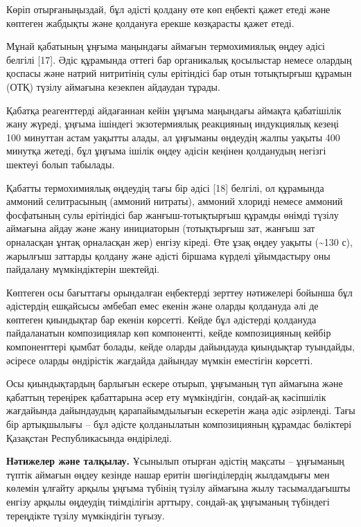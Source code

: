 \begin{multicols}{2}
Көріп отырғаныңыздай, бұл әдісті қолдану өте көп еңбекті қажет етеді
және көптеген жабдықты және қолдануға ерекше көзқарасты қажет етеді.

Мұнай қабатының ұңғыма маңындағы аймағын термохимиялық өңдеу әдісі
белгілі {[}17{]}. Әдіс құрамында оттегі бар органикалық қосылыстар
немесе олардың қоспасы және натрий нитритінің сулы ерітіндісі бар отын
тотықтырғыш құрамын (ОТҚ) түзілу аймағына кезекпен айдаудан тұрады.

Қабатқа реагенттерді айдағаннан кейін ұңғыма маңындағы аймақта
қабатішілік жану жүреді, ұңғыма ішіндегі экзотермиялық реакцияның
индукциялық кезеңі 100 минуттан астам уақытты алады, ал ұңғыманы
өңдеудің жалпы уақыты 400 минутқа жетеді, бұл ұңғыма ішілік өңдеу әдісін
кеңінен қолданудың негізгі шектеуі болып табылады.

Қабатты термохимиялық өңдеудің тағы бір әдісі {[}18{]} белгілі, ол
құрамында аммоний селитрасының (аммоний нитраты), аммоний хлориді немесе
аммоний фосфатының сулы ерітіндісі бар жанғыш-тотықтырғыш құрамды өнімді
түзілу аймағына айдау және жану инициаторын (тотықтырғыш зат, жанғыш зат
орналасқан ұнтақ орналасқан жер) енгізу кіреді. Өте ұзақ өңдеу уақыты
(\textasciitilde130 с), жарылғыш заттарды қолдану және әдісті біршама
күрделі ұйымдастыру оны пайдалану мүмкіндіктерін шектейді.

Көптеген осы бағыттағы орындалған еңбектерді зерттеу нәтижелері бойынша
бұл әдістердің ешқайсысы әмбебап емес екенін және оларды қолдануда әлі
де көптеген қиындықтар бар екенін көрсетті. Кейде бұл әдістерді
қолдануда пайдаланатын композициялар көп компонентті, кейде
композицияның кейбір компоненттері қымбат болады, кейде оларды
дайындауда қиындықтар туындайды, әсіресе оларды өндірістік жағдайда
дайындау мүмкін еместігін көрсетті.

Осы қиындықтардың барлығын ескере отырып, ұңғыманың түп аймағына және
қабаттың тереңірек қабаттарына әсер ету мүмкіндігін, сондай-ақ
кәсіпшілік жағдайында дайындаудың қарапайымдылығын ескеретін жаңа әдіс
әзірленді. Тағы бір артықшылығы -- бұл әдісте қолданылатын композицияның
құрамдас бөліктері Қазақстан Республикасында өндіріледі.

{\bfseries Нәтижелер және талқылау.} Ұсынылып отырған әдістің мақсаты --
ұңғыманың түптік аймағын өңдеу кезінде нашар еритін шөгінділердің
жылдамдығы мен көлемін ұлғайту арқылы ұңғыма түбінің түзілу аймағына
жылу тасымалдағышты енгізу арқылы өңдеудің тиімділігін арттыру,
сондай-ақ ұңғыманың түбіндегі тереңдікте түзілу мүмкіндігін туғызу.


\end{multicols}

